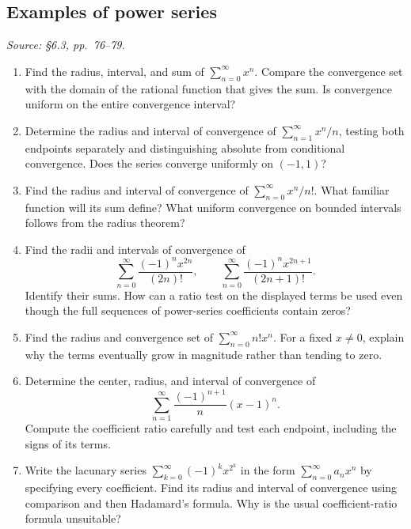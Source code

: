 \subsection{Examples of power series}
\textit{Source: \S6.3, pp.~76--79.}

\begin{enumerate}[resume]
  \item Find the radius, interval, and sum of
    \(\sum_{n=0}^{\infty}x^n\). Compare the convergence set with
    the domain of the rational function that gives the sum.
    Is convergence uniform on the entire convergence interval?

  \item Determine the radius and interval of convergence of
    \(\sum_{n=1}^{\infty}x^n/n\), testing both endpoints separately
    and distinguishing absolute from conditional convergence.
    Does the series converge uniformly on \((-1,1)\)?

  \item Find the radius and interval of convergence of
    \(\sum_{n=0}^{\infty}x^n/n!\). What familiar function will
    its sum define? What uniform convergence on bounded intervals
    follows from the radius theorem?

  \item Find the radii and intervals of convergence of
    \[
      \sum_{n=0}^{\infty}\frac{(-1)^n x^{2n}}{(2n)!},
      \qquad
      \sum_{n=0}^{\infty}\frac{(-1)^n x^{2n+1}}{(2n+1)!}.
    \]
    Identify their sums. How can a ratio test on the displayed
    terms be used even though the full sequences of power-series
    coefficients contain zeros?

  \item Find the radius and convergence set of
    \(\sum_{n=0}^{\infty}n!x^n\).
    For a fixed \(x\ne0\), explain why the terms eventually grow
    in magnitude rather than tending to zero.

  \item Determine the center, radius, and interval of convergence of
    \[
      \sum_{n=1}^{\infty}\frac{(-1)^{n+1}}{n}(x-1)^n.
    \]
    Compute the coefficient ratio carefully and test each endpoint,
    including the signs of its terms.

  \item Write the lacunary series
    \(\sum_{k=0}^{\infty}(-1)^k x^{2^k}\) in the form
    \(\sum_{n=0}^{\infty}a_nx^n\) by specifying every coefficient.
    Find its radius and interval of convergence using comparison
    and then Hadamard's formula. Why is the usual coefficient-ratio
    formula unsuitable?


\end{enumerate}

